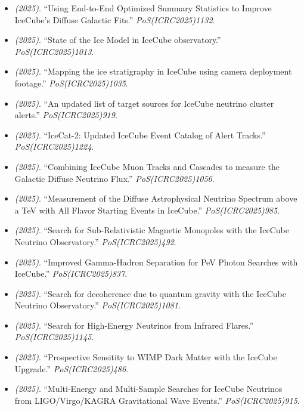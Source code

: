 \begin{itemize}
\item \textit{(2025)}. ``Using End-to-End Optimized Summary Statistics to Improve IceCube's Diffuse Galactic Fits.'' \textit{PoS(ICRC2025)1132}.  
\item \textit{(2025)}. ``State of the Ice Model in IceCube observatory.'' \textit{PoS(ICRC2025)1013}.  
\item \textit{(2025)}. ``Mapping the ice stratigraphy in IceCube using camera deployment footage.'' \textit{PoS(ICRC2025)1035}.  
\item \textit{(2025)}. ``An updated list of target sources for IceCube neutrino cluster alerts.'' \textit{PoS(ICRC2025)919}.  
\item \textit{(2025)}. ``IceCat-2: Updated IceCube Event Catalog of Alert Tracks.'' \textit{PoS(ICRC2025)1224}.  
\item \textit{(2025)}. ``Combining IceCube Muon Tracks and Cascades to measure the Galactic Diffuse Neutrino Flux.'' \textit{PoS(ICRC2025)1056}.  
\item \textit{(2025)}. ``Measurement of the Diffuse Astrophysical Neutrino Spectrum above a TeV with All Flavor Starting Events in IceCube.'' \textit{PoS(ICRC2025)985}.  
\item \textit{(2025)}. ``Search for Sub-Relativistic Magnetic Monopoles with the IceCube Neutrino Observatory.'' \textit{PoS(ICRC2025)492}.  
\item \textit{(2025)}. ``Improved Gamma-Hadron Separation for PeV Photon Searches with IceCube.'' \textit{PoS(ICRC2025)837}.  
\item \textit{(2025)}. ``Search for decoherence due to quantum gravity with the IceCube Neutrino Observatory.'' \textit{PoS(ICRC2025)1081}. 
\item \textit{(2025)}. ``Search for High-Energy Neutrinos from Infrared Flares.'' \textit{PoS(ICRC2025)1145}. 
\item \textit{(2025)}. ``Prospective Sensitity to WIMP Dark Matter with the IceCube Upgrade.'' \textit{PoS(ICRC2025)486}. 
\item \textit{(2025)}. ``Multi-Energy and Multi-Sample Searches for IceCube Neutrinos from LIGO/Virgo/KAGRA Gravitational Wave Events.'' \textit{PoS(ICRC2025)915}. 

\end{itemize}
